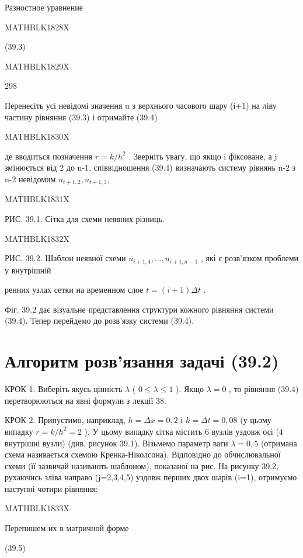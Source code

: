 \documentclass[
  ukrainian,
]{article}
\begin{document}
Разностное уравнение

MATHBLK1828X

(39.3)

MATHBLK1829X

298

Перенесіть усі невідомі значення u з верхнього часового шару (i+1) на
ліву частину рівняння (39.3) і отримайте (39.4)

MATHBLK1830X

де вводиться позначення \(r = k/h^2\) . Зверніть увагу, що якщо i
фіксоване, а j змінюється від 2 до n-1, співвідношення (39.4) визначають
систему рівнянь n-2 з n-2 невідомим \(u_{t+1,2}, u_{t+1,3},\)

MATHBLK1831X

РИС. 39.1. Сітка для схеми неявних різниць.

MATHBLK1832X

РИС. 39.2. Шаблон неявної схеми \(u_{i+1, 4}, \ldots, u_{i+1, n-1}\) ,
які є розв'язком проблеми у внутрішній

ренних узлах сетки на временном слое \(t=(i+1)\Delta t\) .

Фіг. 39.2 дає візуальне представлення структури кожного рівняння системи
(39.4). Тепер перейдемо до розв'язку системи (39.4).

\section{Алгоритм розв'язання задачі
(39.2)}\label{ux430ux43bux433ux43eux440ux438ux442ux43c-ux440ux43eux437ux432ux44fux437ux430ux43dux43dux44f-ux437ux430ux434ux430ux447ux456-39.2}

КРОК 1. Виберіть якусь цінність \(\lambda\) ( \(0 \le \lambda \le 1\) ).
Якщо \(\lambda = 0\) , то рівняння (39.4) перетворюються на явні формули
з лекції 38.

КРОК 2. Припустимо, наприклад, \(h=\Delta x=0,2\) і \(k=\Delta t=0,08\)
(у цьому випадку \(r=k/h^2=2\) ). У цьому випадку сітка містить 6 вузлів
уздовж осі (4 внутрішні вузли) (див. рисунок 39.1). Візьмемо параметр
ваги \(\lambda=0,5\) (отримана схема називається схемою
Кренка-Ніколсона). Відповідно до обчислювальної схеми (її зазвичай
називають шаблоном), показаної на рис. На рисунку 39.2, рухаючись зліва
направо (j=2,3,4,5) уздовж перших двох шарів (i=1), отримуємо наступні
чотири рівняння:

MATHBLK1833X

Перепишем их в матричной форме

(39.5)
\end{document}
